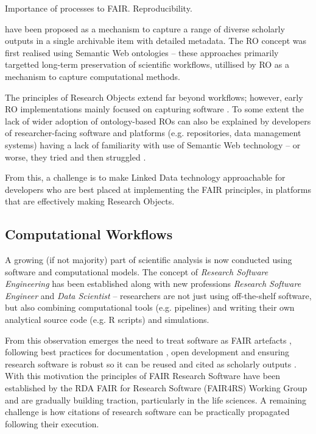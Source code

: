 Importance of processes to FAIR. Reproducibility. 

\cite{Bechhofer 2013} have been proposed as a mechanism to capture a range of diverse scholarly outputs in a single archivable item with detailed metadata. The RO concept was first realised using Semantic Web ontologies \cite{myExperiment 2009,Belhajjame 2015} -- these approaches primarily targetted long-term preservation of \glspl{scientific workflow}, utillised by RO as a mechanism to capture computational methods.

The principles of Research Objects extend far beyond workflows; however, early RO implementations mainly focused on capturing software \cite{Goble 2018}. To some extent the lack of wider adoption of ontology-based ROs can also be explained by developers of researcher-facing software and platforms (e.g. repositories, data management systems) having a lack of familiarity with use of Semantic Web technology -- or worse, they tried and then struggled \cite{Carriero 2010,Tudorache 2020}.

From this, a challenge is to make Linked Data technology approachable for developers who are best placed at implementing the FAIR principles, in platforms that are effectively making Research Objects.




\subsection{Computational Workflows}

A growing (if not majority) part of scientific analysis is now conducted using software and computational models. The concept of \emph{Research Software Engineering} \cite{Cohen 2020} has been established along with new professions \emph{Research Software Engineer} \cite{Baxter 2012} and \emph{Data Scientist} \cite{van der Aalst 2014} -- researchers are not just using off-the-shelf software, but also combining computational tools (e.g. pipelines) and writing their own analytical source code (e.g. R scripts) and simulations.

From this observation emerges the need to treat software as FAIR artefacts \cite{Lamprecht 2019}, following best practices for documentation \cite{Lee 2018}, open development \cite{Prlić 2012} and ensuring research software is robust \cite{Taschuk 2017} so it can be reused and cited as scholarly outputs \cite{Smith 2016}. 
With this motivation the principles of FAIR Research Software \cite{Katz 2021b} have been established by the RDA FAIR for Research Software (FAIR4RS) Working Group \cite{Barker 2022} and are gradually building traction, particularly in the life sciences. A remaining challenge is how citations of research software can be practically propagated following their execution. 

